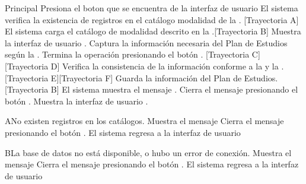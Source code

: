 \begin{UCtrayectoria}{Principal}
    \UCpaso[\UCactor] Presiona el boton \IUbutton{+} que se encuentra de la interfaz de usuario 
	\UCpaso  El sistema verifica la existencia de registros en el catálogo modalidad de la  . [Trayectoria A]
    \UCpaso El sistema carga el catálogo de modalidad descrito en la .[Trayectoria B]
    \UCpaso Muestra la interfaz de usuario .
    \UCpaso[\UCactor] Captura la información necesaria del Plan de Estudios según la .
    \UCpaso[\UCactor] Termina la operación presionando el botón . [Trayectoria C] [Trayectoria D]
    \UCpaso Verifica la consistencia de la información conforme a la  y la . [Trayectoria E][Trayectoria F]
    \UCpaso Guarda la información del Plan de Estudios. [Trayectoria B]
    \UCpaso El sistema muestra el mensaje .
    \UCpaso[\UCactor] Cierra el mensaje presionando el botón .
    \UCpaso Muestra la interfaz de usuario .
\end{UCtrayectoria}
\begin{UCtrayectoriaA}{A}{No existen registros en los catálogos.}
	\UCpaso Muestra el mensaje 
	\UCpaso[\UCactor] Cierra el mensaje presionando el botón .
	\UCpaso El sistema regresa a la interfaz de usuario 
\end{UCtrayectoriaA}
\begin{UCtrayectoriaA}{B}{La base de datos no está disponible, o hubo un error de conexión.}
	\UCpaso Muestra el mensaje 
	\UCpaso[\UCactor] Cierra el mensaje presionando el botón .
    \UCpaso El sistema regresa a la interfaz de usuario 
\end{UCtrayectoriaA}
